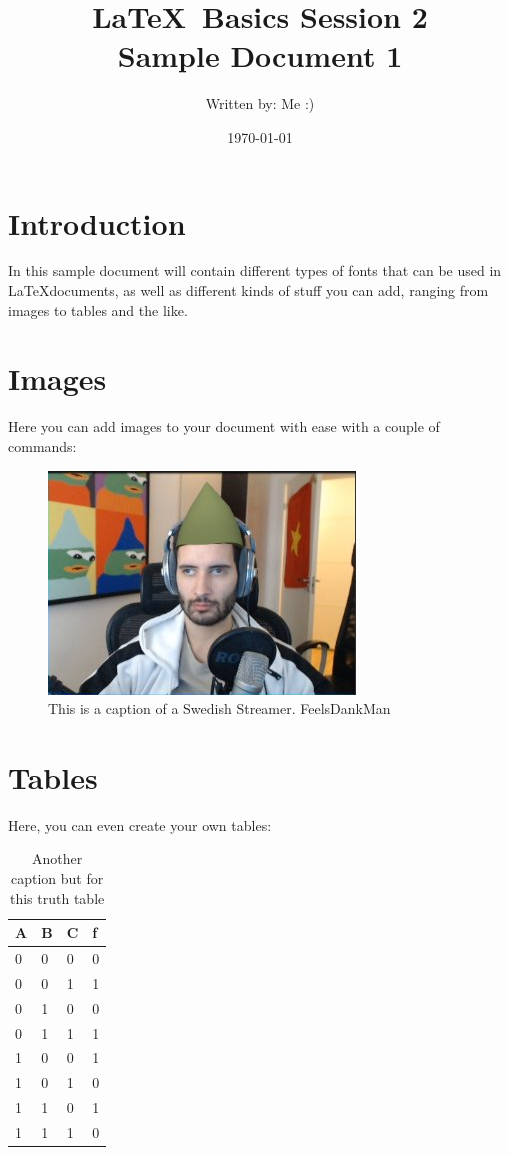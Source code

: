 \documentclass[12pt, a4paper]{article}
\title{\LaTeX \ Basics Session 2 \\ Sample Document 1}
\author{Written by: Me :)}
\date{\today}
\begin{document}
  \maketitle
  \section{Introduction}
      In this sample document will contain different types of fonts that can be used in \LaTeX documents, as well as different kinds of stuff you can add, ranging from images to tables and the like.

  \section{Images}
      Here you can add images to your document with ease with a couple of commands:

      \begin{figure}[H]
          \centering
          \includegraphics[scale = 0.7]{FeelsDankMan.jpg}
          \caption{This is a caption of a Swedish Streamer. FeelsDankMan}
      \end{figure} 

  \newpage
  \section{Tables}

      Here, you can even create your own tables:

      \begin{table}[H]
          \centering
          \begin{tabular}{|| m{2em} | m{2em} | m{2em} | m{2em} ||}
            \hline
            A &B &C &f \\ \hline \hline 
            0 &0 &0 &0 \\ \hline
            0 &0 &1 &1 \\ \hline
            0 &1 &0 &0 \\ \hline
            0 &1 &1 &1 \\ \hline
            1 &0 &0 &1 \\ \hline
            1 &0 &1 &0 \\ \hline
            1 &1 &0 &1 \\ \hline
            1 &1 &1 &0 \\ \hline
          \end{tabular}
          \caption{Another caption but for this truth table}
      \end{table}
\end{document}
